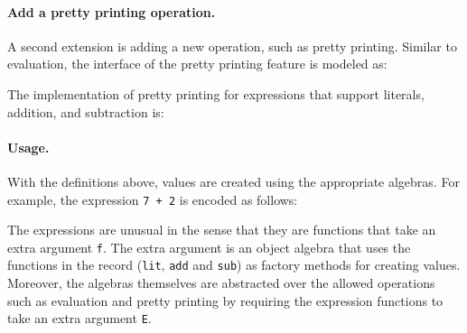 \paragraph{Add a pretty printing operation.}
A second extension is adding a new operation, such as pretty printing.
Similar to evaluation, the interface of the pretty printing feature
is modeled as:
\begin{comment}
  \begin{lstlisting}{language=F2J}
    type IPrint = {print : String};
  \end{lstlisting}
\end{comment}
The implementation of pretty printing for expressions that support literals,
addition, and subtraction is:
\begin{comment}
  \begin{lstlisting}{language=F2J}
    let printAlg : SubExpAlg[IPrint] = {
      lit = \(x: Int) -> {print = x.toString()},
      add = \(x: IPrint) (y: IPrint) -> {
        print = x.print ++ " + " ++ y.print
      },
      sub = \(x: IPrint) (y: IPrint) -> {
        print = x.print ++ " - " ++ y.print
      }
    };
  \end{lstlisting}
\end{comment}

\paragraph{Usage.}
With the definitions above, values are created using the
appropriate algebras. For example, the expression \lstinline{7 + 2}
is encoded as follows:
\begin{comment}
  \begin{lstlisting}{language=F2J}
    let e1[E] (f: SubExpAlg[E]) =
    f.add (f.lit 7) (f.lit 2);
  \end{lstlisting}
\end{comment}

\noindent The expressions are unusual in the sense that they are
functions that take an extra argument \lstinline$f$. The extra
argument is an object algebra that uses the functions in the record
(\lstinline$lit$, \lstinline$add$ and \lstinline$sub$) as factory
methods for creating values. Moreover, the algebras themselves are
abstracted over the allowed operations such as evaluation and pretty
printing by requiring the expression functions to take an extra
argument \lstinline$E$.

